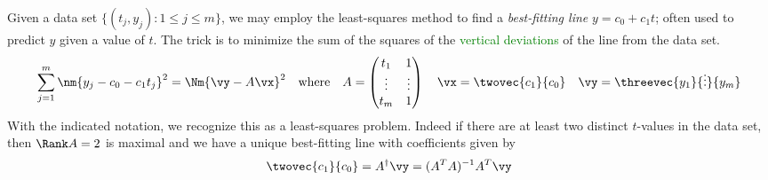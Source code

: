 

Given a data set $\{(t_j,y_j):1\le j\le m\}$, we may employ the least-squares method to find a \emph{best-fitting line} $y=c_0+c_1t$; often used to predict $y$ given a value of $t$.\smallbreak
The trick is to minimize the sum of the squares of the \textcolor{Green}{vertical deviations} of the line from the data set.
\[\sum_{j=1}^m\nm{y_j-c_0-c_1t_j}^2=\Nm{\vy-A\vx}^2\quad\text{where}\quad A=\begin{pmatrix}
t_1&1\\
\vdots&\vdots\\
t_m&1
\end{pmatrix}\quad \vx=\twovec{c_1}{c_0}\quad \vy=\threevec{y_1}{\vdots}{y_m} \]
With the indicated notation, we recognize this as a least-squares problem. Indeed if there are at least two distinct $t$-values in the data set, then $\Rank A=2$ is maximal and we have a unique best-fitting line with coefficients given by
\[\twovec{c_1}{c_0}=A^\dag\vy =(A^TA)^{-1}A^T\vy\]


